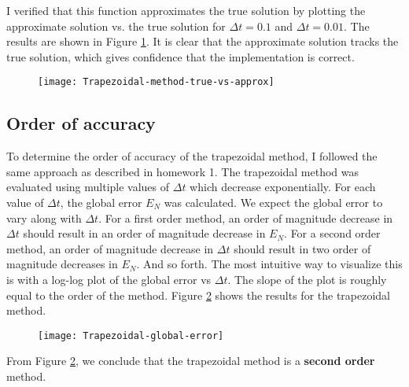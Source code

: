 \documentclass{article}
\begin{document}
I verified that this function approximates the true solution by plotting the approximate solution vs. the true solution for \(\Delta t = 0.1\) and \(\Delta t = 0.01\).  The results are shown in Figure \ref{fig:trapezoidal-approx}.  It is clear that the approximate solution tracks the true solution, which gives confidence that the implementation is correct.
\begin{figure}[H]
	\centering
	\texttt{[image: Trapezoidal-method-true-vs-approx]}
	\caption{}
	\label{fig:trapezoidal-approx}
\end{figure}
\subsection{Order of accuracy}
To determine the order of accuracy of the trapezoidal method, I followed the same approach as described in homework 1. The trapezoidal method was evaluated using multiple values of $\Delta t$ which decrease exponentially.  For each value of $\Delta t$, the global error $E_N$ was calculated.  We expect the global error to vary along with $\Delta t$.  For a first order method, an order of magnitude decrease in $\Delta t$ should result in an order of magnitude decrease in $E_N$.  For a second order method, an order of magnitude decrease in $\Delta t$ should result in two order of magnitude decreases in $E_N$.  And so forth.  The most intuitive way to visualize this is with a log-log plot of the global error vs $\Delta t$.  The slope of the plot is roughly equal to the order of the method.  Figure \ref{fig:trapezoidal-global-error} shows the results for the trapezoidal method.
\begin{figure}[H]
	\centering
	\texttt{[image: Trapezoidal-global-error]}
	\caption{}
	\label{fig:trapezoidal-global-error}
\end{figure}
From Figure \ref{fig:trapezoidal-global-error}, we conclude that the trapezoidal method is a \textbf{second order} method.
\end{document}
